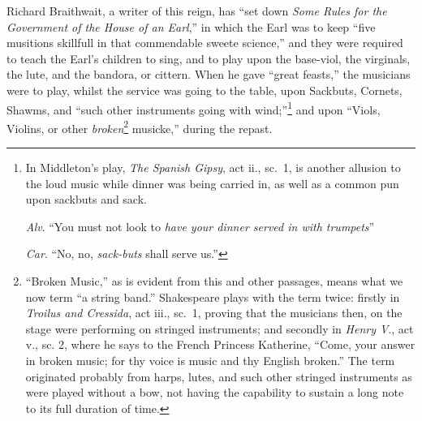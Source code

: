 Richard Braithwait, a writer of this reign, has “set down \textit{Some Rules for the
Government of the House of an Earl},” in which the Earl was to keep “five
musitions skillfull in that commendable sweete science,” and they were required
to teach the Earl’s children to sing, and to play upon the base-viol, the virginals,
the lute, and the bandora, or cittern. When he gave “great feasts,” the musicians
were to play, whilst the service was going to the table, upon Sackbuts,
Cornets, Shawms, and “such other instruments going with wind;”\footnote{\textit{}
In Middleton’s play, \textit{The Spanish Gipsy}, act ii., sc.~1,
is another allusion to the loud music while dinner was
being carried in, as well as a common pun upon sackbuts
and sack.

\textit{Alv}. “You must not look to \textit{have your dinner served in
with trumpets}”

\textit{Car}. “No, no, \textit{sack-buts} shall serve us.”}%
and upon
“Viols, Violins, or other \textit{broken}\footnote{\textit{}
“Broken Music,” as is evident from this and other
passages, means what we now term “a string band.”
Shakespeare plays with the term twice: firstly in\textit{ Troilus
and Cressida}, act iii., sc.~1, proving that the musicians then,
on the stage were performing on stringed instruments;
and secondly in \textit{Henry V}., act v., sc. 2, where he says to
the French Princess Katherine, “Come, your answer in
broken music; for thy voice is music and thy English
broken.” The term originated probably from harps, lutes,
and such other stringed instruments as were played without
a bow, not having the capability to sustain a long note
to its full duration of time.}
musicke,” during the repast.

